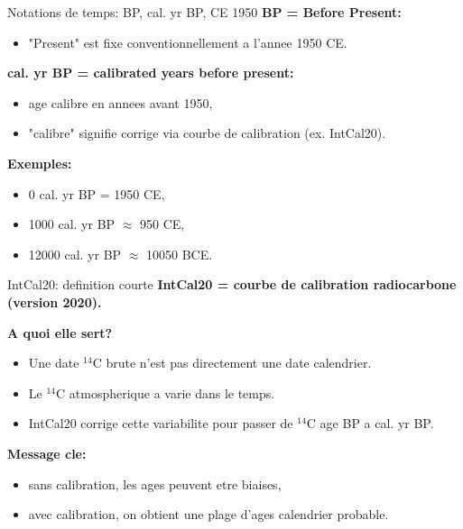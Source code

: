 \documentclass[aspectratio=169,11pt]{beamer}
\begin{document}
\begin{frame}{Notations de temps: BP, cal. yr BP, CE 1950}
\textbf{BP = Before Present:}
\begin{itemize}
  \item "Present" est fixe conventionnellement a l'annee \alert{1950 CE}.
\end{itemize}

\textbf{cal. yr BP = calibrated years before present:}
\begin{itemize}
  \item age calibre en annees avant 1950,
  \item "calibre" signifie corrige via courbe de calibration (ex. IntCal20).
\end{itemize}

\textbf{Exemples:}
\begin{itemize}
  \item 0 cal. yr BP = 1950 CE,
  \item 1000 cal. yr BP \(\approx\) 950 CE,
  \item 12000 cal. yr BP \(\approx\) 10050 BCE.
\end{itemize}
\end{frame}

\begin{frame}{IntCal20: definition courte}
\textbf{IntCal20 = courbe de calibration radiocarbone (version 2020).}

\vspace{0.2cm}
\textbf{A quoi elle sert?}
\begin{itemize}
  \item Une date \(^{14}\)C brute n'est pas directement une date calendrier.
  \item Le \(^{14}\)C atmospherique a varie dans le temps.
  \item IntCal20 corrige cette variabilite pour passer de \(^{14}\)C age BP a cal. yr BP.
\end{itemize}

\textbf{Message cle:}
\begin{itemize}
  \item sans calibration, les ages peuvent etre biaises,
  \item avec calibration, on obtient une plage d'ages calendrier probable.
\end{itemize}
\end{frame}
\end{document}
